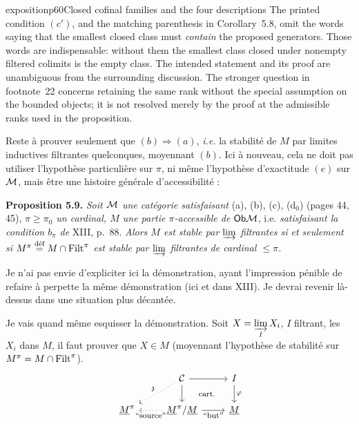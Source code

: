\begin{dcomment}{exposition}{p60}{Closed cofinal families and the four descriptions}
The printed condition $(c')$, and the matching parenthesis in Corollary~5.8, omit the words saying that the smallest closed class must \emph{contain} the proposed generators. Those words are indispensable: without them the smallest class closed under nonempty filtered colimits is the empty class. The intended statement and its proof are unambiguous from the surrounding discussion. The stronger question in footnote~22 concerns retaining the same rank without the special assumption on the bounded objects; it is not resolved merely by the proof at the admissible ranks used in the proposition.
\end{dcomment}


Reste à prouver seulement que $(b) \Longrightarrow (a)$, \textit{i.e.} la stabilité de $M$ par limites inductives filtrantes quelconques, moyennant $(b)$. Ici à nouveau, cela ne doit pas utiliser l'hypothèse particulière sur $\pi$, ni même l'hypothèse d'exactitude $(e)$ sur $\mathcal{M}$, mais être une histoire générale d'accessibilité :

\textbf{Proposition 5.9.} \textit{Soit $\mathcal{M}$ une catégorie satisfaisant} (a), (b), (c), (d$_0$) (pages 44, 45), \textit{$\pi \geq \pi_0$ un cardinal, $M$ une partie $\pi$-accessible de} $\mathsf{Ob}\mathcal{M}$, i.e. \textit{satisfaisant la condition $b_\pi$ de} XIII, p.~88. \textit{Alors $M$ est stable par $\varinjlim$ filtrantes si et seulement si $M^\pi \overset{\text{déf}}{=} M \cap \mathrm{Filt}^\pi$ est stable par $\varinjlim$ filtrantes de cardinal $\leq \pi$.}

Je n'ai pas envie d'expliciter ici la démonstration, ayant l'impression pénible de refaire à perpette la même démonstration (ici et dans XIII). Je devrai revenir là-dessus dans une situation plus décantée.


Je vais quand même esquisser la démonstration. Soit $X = \varinjlim\limits_{I} X_i$, $I$ filtrant, les $X_i$ dans $M$, il faut prouver que $X \in M$ (moyennant l'hypothèse de stabilité sur $M^\pi = M \cap \mathrm{Filt}^\pi$).
\[
\begin{tikzcd}
& \Ci \arrow[r] \arrow[d] \arrow[dl, dotted, "\mathfrak{z}"'] \arrow[dr, phantom, "\text{\footnotesize cart.}"] & I \arrow[d, "\varphi"] \\
\underline{M}^\pi & \underline{M}^\pi/\underline{M} \arrow[l, dotted, "\text{\footnotesize “source”}"] \arrow[r, "\text{\footnotesize “but”}"'] & \underline{M}
\end{tikzcd}
\] %

